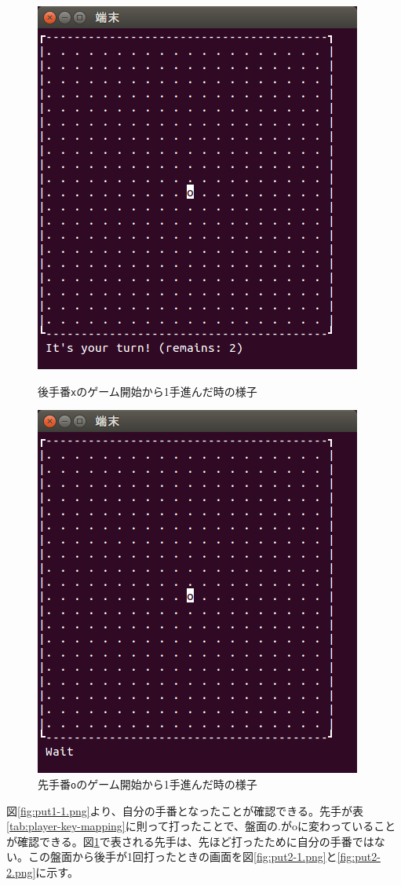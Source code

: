 \documentclass[a4j, titlepage, 10pt]{jsarticle}
\newcommand{\code}[1]{\texttt{#1}}
\begin{document}
\begin{figure}[H]
  \begin{minipage}{0.5\hsize}
    \centering
    \includegraphics[scale=0.5]{img/put1-1.png}
    \caption{後手番\code{x}のゲーム開始から1手進んだ時の様子}
    \label{fig:put1-1.png}
  \end{minipage}
  \begin{minipage}{0.5\hsize}
    \includegraphics[scale=0.5]{img/put1-2.png}
    \caption{先手番\code{o}のゲーム開始から1手進んだ時の様子}
    \label{fig:put1-2.png}
  \end{minipage}
\end{figure}
図\ref{fig:put1-1.png}より、自分の手番となったことが確認できる。先手が表\ref{tab:player-key-mapping}に則って打ったことで、盤面の{\ttfamily .}が{\ttfamily o}に変わっていることが確認できる。図\ref{fig:put1-2.png}で表される先手は、先ほど打ったために自分の手番ではない。この盤面から後手が1回打ったときの画面を図\ref{fig:put2-1.png}と\ref{fig:put2-2.png}に示す。
\end{document}
